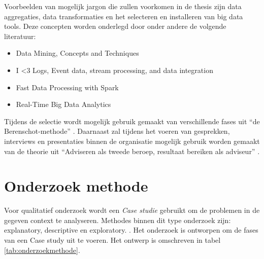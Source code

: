Voorbeelden van mogelijk jargon die zullen voorkomen in de thesis zijn data aggregaties, data transformaties en het selecteren en installeren van big data tools. Deze concepten worden onderlegd door onder andere de volgende literatuur:

\begin{itemize}
    \item Data Mining, Concepts and Techniques \parencite{data-mining}
    \item I <3 Logs, Event data, stream processing, and data integration \parencite{logs}
    \item Fast Data Processing with Spark \parencite{spark}
    \item Real-Time Big Data Analytics \parencite{realtime-architectures}
\end{itemize}

Tijdens de selectie wordt mogelijk gebruik gemaakt van verschillende fases uit “de Berenschot-methode” \parencite{cuppen}.
Daarnaast zal tijdens het voeren van gesprekken, interviews en presentaties binnen de organisatie mogelijk gebruik worden gemaakt van de theorie uit “Adviseren als tweede beroep, resultaat bereiken als adviseur” \parencite{adviseren}.

\newpage

\section{Onderzoek methode} %
\label{sec:onderzoekmethode}


Voor qualitatief onderzoek wordt een \textit{Case studie} gebruikt om de problemen in de gegeven context te analyseren. Methodes binnen dit type onderzoek zijn: explanatory, descriptive en exploratory. \parencite{john-dudovskiy}. Het onderzoek is ontworpen om de fases van een Case study uit te voeren. Het ontwerp is omschreven in tabel \ref{tab:onderzoekmethode}.

